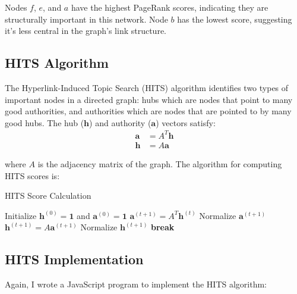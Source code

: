 \documentclass{article}
\begin{document}
Nodes $f$, $e$, and $a$ have the highest PageRank scores, indicating they are structurally important in this network. Node $b$ has the lowest score, suggesting it's less central in the graph's link structure.

\subsection{HITS Algorithm}
The Hyperlink-Induced Topic Search (HITS) algorithm identifies two types of important nodes in a directed graph: hubs which are nodes that point to many good authorities, and authorities which are nodes that are pointed to by many good hubs. The hub ($\mathbf{h}$) and authority ($\mathbf{a}$) vectors satisfy:
\begin{align}
\mathbf{a} &= A^T \mathbf{h} \\
\mathbf{h} &= A \mathbf{a}
\end{align}

where $A$ is the adjacency matrix of the graph. The algorithm for computing HITS scores is:

\begin{algorithm}
\caption{HITS Score Calculation}
\begin{algorithmic}[1]
\State Initialize $\mathbf{h}^{(0)} = \mathbf{1}$ and $\mathbf{a}^{(0)} = \mathbf{1}$
    \State $\mathbf{a}^{(t+1)} = A^T \mathbf{h}^{(t)}$
    \State Normalize $\mathbf{a}^{(t+1)}$
    \State $\mathbf{h}^{(t+1)} = A \mathbf{a}^{(t+1)}$
    \State Normalize $\mathbf{h}^{(t+1)}$
        \State \textbf{break}
    \EndIf
\EndFor
\end{algorithmic}
\end{algorithm}

\subsection{HITS Implementation}
Again, I wrote a JavaScript program to implement the HITS algorithm:
\end{document}
